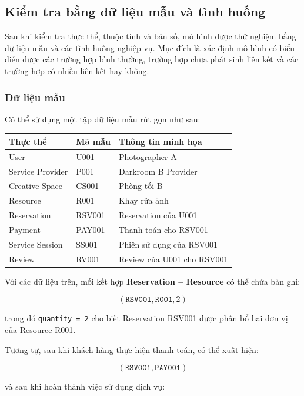 \subsection{Kiểm tra bằng dữ liệu mẫu và tình huống}

Sau khi kiểm tra thực thể, thuộc tính và bản số, mô hình được thử nghiệm bằng dữ liệu mẫu và các tình huống nghiệp vụ. Mục đích là xác định mô hình có biểu diễn được các trường hợp bình thường, trường hợp chưa phát sinh liên kết và các trường hợp có nhiều liên kết hay không.

\subsubsection{Dữ liệu mẫu}

Có thể sử dụng một tập dữ liệu mẫu rút gọn như sau:

\begin{center}
\scriptsize
\begin{tabular}{p{.20\linewidth} p{.25\linewidth} p{.42\linewidth}}
\toprule
\textbf{Thực thể} & \textbf{Mã mẫu} & \textbf{Thông tin minh họa} \\
\midrule
User & U001 & Photographer A \\
Service Provider & P001 & Darkroom B Provider \\
Creative Space & CS001 & Phòng tối B \\
Resource & R001 & Khay rửa ảnh \\
Reservation & RSV001 & Reservation của U001 \\
Payment & PAY001 & Thanh toán cho RSV001 \\
Service Session & SS001 & Phiên sử dụng của RSV001 \\
Review & RV001 & Review của U001 cho RSV001 \\
\bottomrule
\end{tabular}
\end{center}

Với các dữ liệu trên, mối kết hợp \textbf{Reservation -- Resource} có thể chứa bản ghi:

$$
(\texttt{RSV001},\texttt{R001},2)
$$

trong đó \texttt{quantity = 2} cho biết Reservation RSV001 được phân bổ hai đơn vị của Resource R001.

Tương tự, sau khi khách hàng thực hiện thanh toán, có thể xuất hiện:

$$
(\texttt{RSV001},\texttt{PAY001})
$$

và sau khi hoàn thành việc sử dụng dịch vụ:

